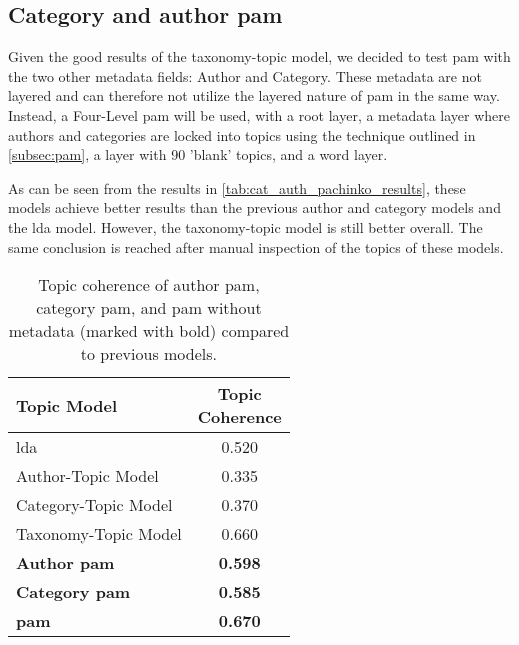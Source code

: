 \subsection{Category and author \gls{pam}}\label{app:cat_auth_pachinko}
Given the good results of the taxonomy-topic model, we decided to test \gls{pam} with the two other metadata fields: Author and Category.
These metadata are not layered and can therefore not utilize the layered nature of \gls{pam} in the same way.
Instead, a Four-Level \gls{pam} will be used, with a root layer, a metadata layer where authors and categories are locked into topics using the technique outlined in \autoref{subsec:pam}, a layer with 90 'blank' topics, and a word layer.

As can be seen from the results in \autoref{tab:cat_auth_pachinko_results}, these models achieve better results than the previous author and category models and the \gls{lda} model.
However, the taxonomy-topic model is still better overall.
The same conclusion is reached after manual inspection of the topics of these models.

\begin{table}[h]
	\centering
	\caption{Topic coherence of author \gls{pam}, category \gls{pam}, and \gls{pam} without metadata (marked with bold) compared to previous models.}
	\begin{tabular}{l|c}
		Topic Model & \makecell{Topic \\ Coherence} \\
		\midrule
		\Acrlong{lda} & 0.520 \\
		Author-Topic Model & 0.335 \\
		Category-Topic Model & 0.370 \\
		Taxonomy-Topic Model & 0.660 \\
		\textbf{Author \gls{pam}} & \textbf{0.598} \\
		\textbf{Category \gls{pam}} & \textbf{0.585} \\
		\textbf{\Acrlong{pam}} & \textbf{0.670} \\
	\end{tabular}
	\label{tab:cat_auth_pachinko_results}
\end{table}


